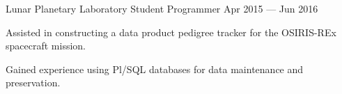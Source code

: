 \begin{cventries}
  \cventry
    {Lunar Planetary Laboratory} %
    {Student Programmer} %
    {Apr 2015 --- Jun 2016} %
    {} %
    {
      \begin{cvitems} %
        \item Assisted in constructing a data product pedigree tracker for the OSIRIS-REx spacecraft mission.
        \item Gained experience using Pl/SQL databases for data maintenance and preservation.
        \item <insert new text here>
      \end{cvitems}
    }

\end{cventries}
